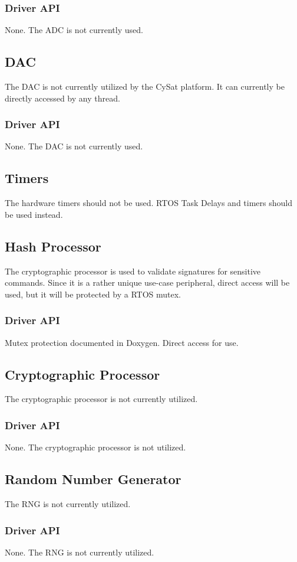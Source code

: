 \documentclass{article}
\begin{document}
\subsubsection{Driver API}
None. The ADC is not currently used.

\subsection{DAC}
The DAC is not currently utilized by the CySat platform. It can currently
be directly accessed by any thread.
\subsubsection{Driver API}
None. The DAC is not currently used.

\subsection{Timers}
The hardware timers should not be used. RTOS Task Delays and timers should be used instead.

\subsection{Hash Processor}
The cryptographic processor is used to validate signatures for sensitive commands. Since it
is a rather unique use-case peripheral, direct access will be used, but it will be
protected by a RTOS mutex.
\subsubsection{Driver API}
Mutex protection documented in Doxygen. Direct access for use.

\subsection{Cryptographic Processor}
The cryptographic processor is not currently utilized.
\subsubsection{Driver API}
None. The cryptographic processor is not utilized.

\subsection{Random Number Generator}
The RNG is not currently utilized.
\subsubsection{Driver API}
None. The RNG is not currently utilized.
\end{document}
